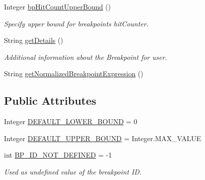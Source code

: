 \begin{DoxyCompactItemize}
Integer \hyperlink{classgov_1_1nasa_1_1jpf_1_1inspector_1_1server_1_1breakpoints_1_1_break_point_status_impl_aee4da392b6d31c578fa9471d262026af}{bp\+Hit\+Count\+Upper\+Bound} ()
\begin{DoxyCompactList}\small\item\em Specify upper bound for breakpoint\textquotesingle{}s hit\+Counter. \end{DoxyCompactList}\item 
String \hyperlink{classgov_1_1nasa_1_1jpf_1_1inspector_1_1server_1_1breakpoints_1_1_break_point_status_impl_ae46a6e147e877a94e69b881e440e38ca}{get\+Details} ()
\begin{DoxyCompactList}\small\item\em Additional information about the Breakpoint for user. \end{DoxyCompactList}\item 
String \hyperlink{classgov_1_1nasa_1_1jpf_1_1inspector_1_1server_1_1breakpoints_1_1_break_point_status_impl_a0c5a9b2446bff15b00e58240c14de583}{get\+Normalized\+Breakpoint\+Expression} ()
\end{DoxyCompactItemize}
\subsection*{Public Attributes}
\begin{DoxyCompactItemize}
\item 
Integer \hyperlink{interfacegov_1_1nasa_1_1jpf_1_1inspector_1_1interfaces_1_1_break_point_creation_information_a40131b93f82a84ed5322c4dc5ca4175e}{D\+E\+F\+A\+U\+L\+T\+\_\+\+L\+O\+W\+E\+R\+\_\+\+B\+O\+U\+ND} = 0
\item 
Integer \hyperlink{interfacegov_1_1nasa_1_1jpf_1_1inspector_1_1interfaces_1_1_break_point_creation_information_af917e7de77b2a6fc93c24e1c5a4a5759}{D\+E\+F\+A\+U\+L\+T\+\_\+\+U\+P\+P\+E\+R\+\_\+\+B\+O\+U\+ND} = Integer.\+M\+A\+X\+\_\+\+V\+A\+L\+UE
\item 
int \hyperlink{interfacegov_1_1nasa_1_1jpf_1_1inspector_1_1interfaces_1_1_break_point_creation_information_a24626231e3744e59f505d0731d4ca9e1}{B\+P\+\_\+\+I\+D\+\_\+\+N\+O\+T\+\_\+\+D\+E\+F\+I\+N\+ED} = -\/1
\begin{DoxyCompactList}\small\item\em Used as undefined value of the breakpoint ID. \end{DoxyCompactList}\end{DoxyCompactItemize}
